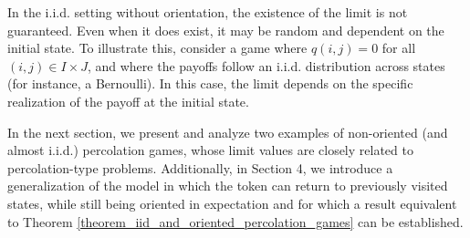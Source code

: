 	In the i.i.d. setting without orientation, the existence of the limit is not guaranteed. Even when it does exist, it may be random and dependent on the initial state. To illustrate this, consider a game where $q(i, j) = 0$ for all $(i, j) \in I \times J$, and where the payoffs follow an i.i.d. distribution across states (for instance, a Bernoulli). In this case, the limit depends on the specific realization of the payoff at the initial state.


	In the next section, we present and analyze two examples of non-oriented (and almost i.i.d.) percolation games, whose limit values are closely related to percolation-type problems. Additionally, in Section 4, we introduce a generalization of the model in which the token can return to previously visited states, while still being oriented in expectation and for which a result equivalent to Theorem \ref{theorem_iid_and_oriented_percolation_games} can be established.